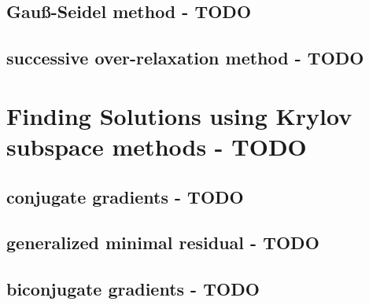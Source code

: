\subsection{Gauß-Seidel method - TODO}


\subsection{successive over-relaxation method - TODO}


\section{Finding Solutions using Krylov subspace methods - TODO}


\subsection{conjugate gradients - TODO}


\subsection{generalized minimal residual - TODO}


\subsection{biconjugate gradients - TODO}


































